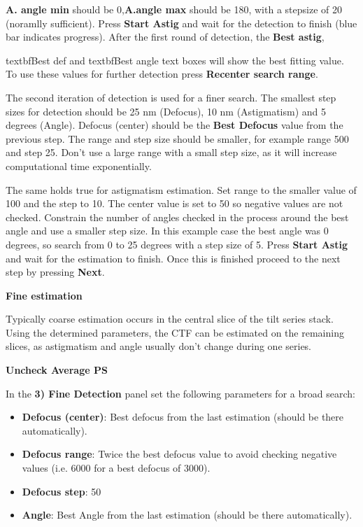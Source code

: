 \documentclass[12pt,a4paper]{scrartcl}
\begin{document}
\newline\textbf{A. angle min} should be 0,\textbf{A.angle max} should be 180, with a stepsize of 20 (noramlly sufficient). Press \textbf{Start Astig} and wait for the detection to finish (blue bar indicates progress). After the first round of detection, the \textbf{Best astig}, {textbf{Best def} and textbf{Best angle} text boxes will show the best fitting value. To use these values for further detection press \textbf{Recenter search range}.

The second iteration of detection is used for a finer search. The smallest step sizes for detection should be 25 nm (Defocus), 10 nm (Astigmatism) and 5 degrees (Angle).
Defocus (center) should be the \textbf{Best Defocus} value from the previous step. The range and step size should be smaller, for example range 500 and step 25. Don’t use a large range with a small step size, as it will increase computational time exponentially.

The same holds true for astigmatism estimation. Set range to the smaller value of 100 and the step to 10. The center value is set to 50 so negative values are not checked.
Constrain the number of angles checked in the process around the best angle and use a smaller step size. In this example case the best angle was 0 degrees, so search from 0 to 25 degrees with a step size of 5.
Press \textbf{Start Astig} and wait for the estimation to finish.
Once this is finished proceed to the next step by pressing \textbf{Next}. 
\vspace{1em}
\par\textbf{Fine estimation}
\vspace{1em}

Typically coarse estimation occurs in the central slice of the tilt series stack. Using the determined parameters, the CTF can be estimated on the remaining slices, as astigmatism and angle usually don’t change during one series.
\vspace{1em}

\centerline{{\color{red}\textbf{Uncheck Average PS}}}
\vspace{1em}

In the \textbf{3) Fine Detection} panel set the following parameters for a broad search:

\begin{itemize}
\item \textbf{Defocus (center)}: Best defocus from the last estimation (should be there automatically). 
\item \textbf{Defocus range}: Twice the best defocus value to avoid checking negative values (i.e. 6000 for a best defocus of 3000). 
\item \textbf{Defocus step}: 50
\item \textbf{Angle}: Best Angle from the last estimation (should be there automatically). 
\end{itemize}

}
\end{document}
